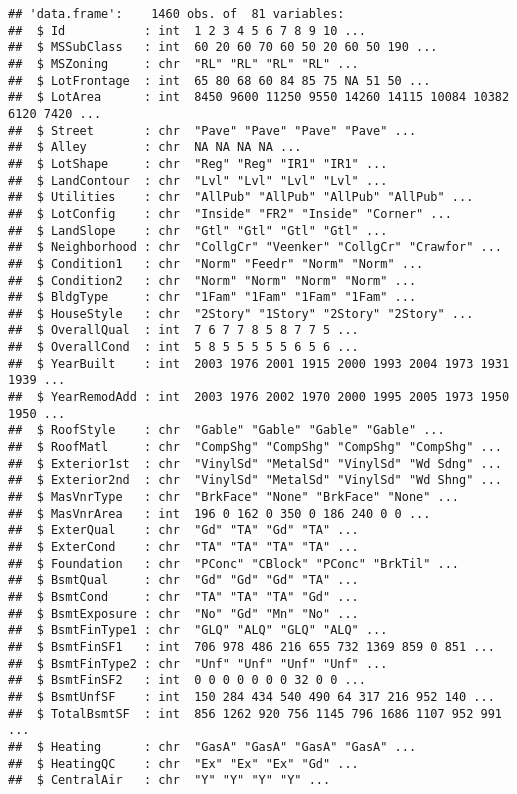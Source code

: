 \documentclass[
]{article}
\begin{document}
\begin{verbatim}
## 'data.frame':    1460 obs. of  81 variables:
##  $ Id           : int  1 2 3 4 5 6 7 8 9 10 ...
##  $ MSSubClass   : int  60 20 60 70 60 50 20 60 50 190 ...
##  $ MSZoning     : chr  "RL" "RL" "RL" "RL" ...
##  $ LotFrontage  : int  65 80 68 60 84 85 75 NA 51 50 ...
##  $ LotArea      : int  8450 9600 11250 9550 14260 14115 10084 10382 6120 7420 ...
##  $ Street       : chr  "Pave" "Pave" "Pave" "Pave" ...
##  $ Alley        : chr  NA NA NA NA ...
##  $ LotShape     : chr  "Reg" "Reg" "IR1" "IR1" ...
##  $ LandContour  : chr  "Lvl" "Lvl" "Lvl" "Lvl" ...
##  $ Utilities    : chr  "AllPub" "AllPub" "AllPub" "AllPub" ...
##  $ LotConfig    : chr  "Inside" "FR2" "Inside" "Corner" ...
##  $ LandSlope    : chr  "Gtl" "Gtl" "Gtl" "Gtl" ...
##  $ Neighborhood : chr  "CollgCr" "Veenker" "CollgCr" "Crawfor" ...
##  $ Condition1   : chr  "Norm" "Feedr" "Norm" "Norm" ...
##  $ Condition2   : chr  "Norm" "Norm" "Norm" "Norm" ...
##  $ BldgType     : chr  "1Fam" "1Fam" "1Fam" "1Fam" ...
##  $ HouseStyle   : chr  "2Story" "1Story" "2Story" "2Story" ...
##  $ OverallQual  : int  7 6 7 7 8 5 8 7 7 5 ...
##  $ OverallCond  : int  5 8 5 5 5 5 5 6 5 6 ...
##  $ YearBuilt    : int  2003 1976 2001 1915 2000 1993 2004 1973 1931 1939 ...
##  $ YearRemodAdd : int  2003 1976 2002 1970 2000 1995 2005 1973 1950 1950 ...
##  $ RoofStyle    : chr  "Gable" "Gable" "Gable" "Gable" ...
##  $ RoofMatl     : chr  "CompShg" "CompShg" "CompShg" "CompShg" ...
##  $ Exterior1st  : chr  "VinylSd" "MetalSd" "VinylSd" "Wd Sdng" ...
##  $ Exterior2nd  : chr  "VinylSd" "MetalSd" "VinylSd" "Wd Shng" ...
##  $ MasVnrType   : chr  "BrkFace" "None" "BrkFace" "None" ...
##  $ MasVnrArea   : int  196 0 162 0 350 0 186 240 0 0 ...
##  $ ExterQual    : chr  "Gd" "TA" "Gd" "TA" ...
##  $ ExterCond    : chr  "TA" "TA" "TA" "TA" ...
##  $ Foundation   : chr  "PConc" "CBlock" "PConc" "BrkTil" ...
##  $ BsmtQual     : chr  "Gd" "Gd" "Gd" "TA" ...
##  $ BsmtCond     : chr  "TA" "TA" "TA" "Gd" ...
##  $ BsmtExposure : chr  "No" "Gd" "Mn" "No" ...
##  $ BsmtFinType1 : chr  "GLQ" "ALQ" "GLQ" "ALQ" ...
##  $ BsmtFinSF1   : int  706 978 486 216 655 732 1369 859 0 851 ...
##  $ BsmtFinType2 : chr  "Unf" "Unf" "Unf" "Unf" ...
##  $ BsmtFinSF2   : int  0 0 0 0 0 0 0 32 0 0 ...
##  $ BsmtUnfSF    : int  150 284 434 540 490 64 317 216 952 140 ...
##  $ TotalBsmtSF  : int  856 1262 920 756 1145 796 1686 1107 952 991 ...
##  $ Heating      : chr  "GasA" "GasA" "GasA" "GasA" ...
##  $ HeatingQC    : chr  "Ex" "Ex" "Ex" "Gd" ...
##  $ CentralAir   : chr  "Y" "Y" "Y" "Y" ...

\end{verbatim}
\end{document}
